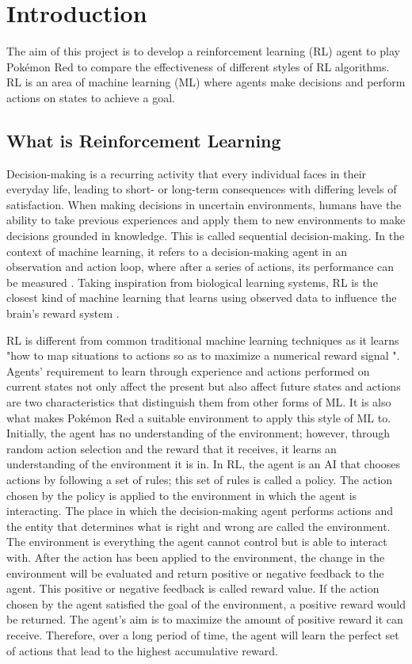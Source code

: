 \section{Introduction}
The aim of this project is to develop a reinforcement learning (RL) agent to play Pokémon Red to compare
the effectiveness of different styles of RL algorithms. RL is an area of machine learning (ML) where
agents make decisions and perform actions on states to achieve a goal.


\subsection{What is Reinforcement Learning}

Decision-making is a recurring activity that every individual faces in their everyday life, leading to short- or long-term consequences with differing levels of satisfaction. When making decisions in uncertain environments, humans have the ability to take previous experiences and apply them to new environments to make decisions grounded in knowledge. This is called sequential decision-making. In the context of machine learning, it refers to a decision-making agent in an observation and action loop, where after a series of actions, its performance can be measured \cite{francon2020effective}. Taking inspiration from biological learning systems, RL is the closest kind of machine learning that learns using observed data to influence the brain's reward system \cite{Sutton1}. 

RL is different from common traditional machine learning techniques as it learns "how to map situations to actions so as to maximize a numerical reward signal \cite{Sutton1}". Agents' requirement to learn through experience and actions performed on current states not only affect the present but also affect future states and actions are two characteristics that distinguish them from other forms of ML. It is also what makes Pokémon Red a suitable environment to apply this style of ML to. Initially, the agent has no understanding of the environment; however, through random action selection and the reward that it receives, it learns an understanding of the environment it is in. In RL, the agent is an AI that chooses actions by following a set of rules; this set of rules is called a policy. The action chosen by the policy is applied to the environment in which the agent is interacting. The place in which the decision-making agent performs actions and the entity that determines what is right and wrong are called the environment. The environment is everything the agent cannot control but is able to interact with. After the action has been applied to the environment, the change in the environment will be evaluated and return positive or negative feedback to the agent. This positive or negative feedback is called reward value. If the action chosen by the agent satisfied the goal of the environment, a positive reward would be returned. The agent’s aim is to maximize the amount of positive reward it can receive. Therefore, over a long period of time, the agent will learn the perfect set of actions that lead to the highest accumulative reward. 

